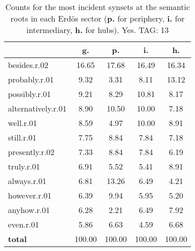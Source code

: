 \begin{table}[h!]
\begin{center}
\begin{tabular}{| l | c | c | c | c |}\hline
 & g. & p. & i. & h. \\\hline
besides.r.02 & 16.65  & 17.68  & 16.49  & 16.34 \\\hline
probably.r.01 & 9.32  & 3.31  & 8.11  & 13.12 \\\hline
possibly.r.01 & 9.21  & 8.29  & 10.81  & 8.17 \\\hline
alternatively.r.01 & 8.90  & 10.50  & 10.00  & 7.18 \\\hline
well.r.01 & 8.59  & 4.97  & 10.00  & 8.91 \\\hline
still.r.01 & 7.75  & 8.84  & 7.84  & 7.18 \\\hline
presently.r.02 & 7.33  & 8.84  & 7.84  & 6.19 \\\hline
truly.r.01 & 6.91  & 5.52  & 5.41  & 8.91 \\\hline
always.r.01 & 6.81  & 13.26  & 6.49  & 4.21 \\\hline
however.r.01 & 6.39  & 9.94  & 5.95  & 5.20 \\\hline
anyhow.r.01 & 6.28  & 2.21  & 6.49  & 7.92 \\\hline
even.r.01 & 5.86  & 6.63  & 4.59  & 6.68 \\\hline
{{\bf total}} & 100.00  & 100.00  & 100.00  & 100.00 \\\hline
\end{tabular}
\caption{Counts for the most incident synsets at the semantic roots in each Erd\"os sector ({\bf p.} for periphery, {\bf i.} for intermediary, {\bf h.} for hubs). Yes. TAG: 13}
\end{center}
\end{table}
